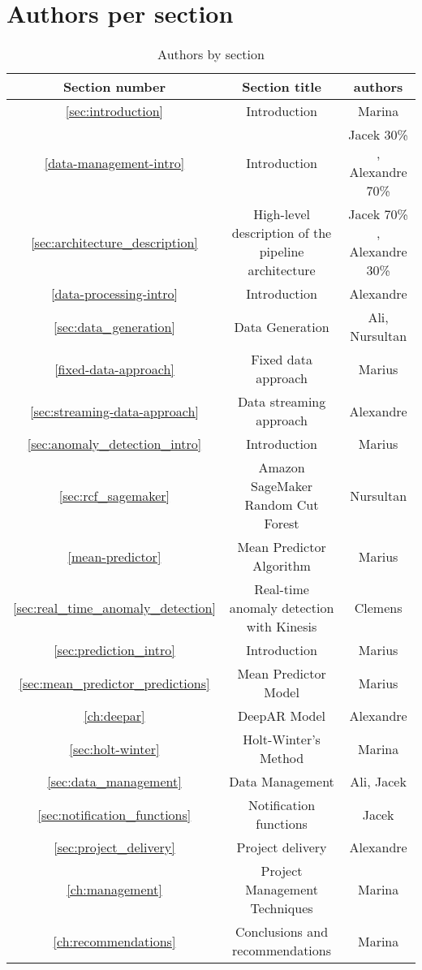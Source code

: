 \section{Authors per section}
\begin{table}
    \centering
    \begin{tabular}{c|c|c}
    \hline
      Section number & Section title & authors \\
    \hline
        \ref{sec:introduction} & Introduction & Marina  \\
        \hline
        \ref{data-management-intro} & Introduction & Jacek 30\% , Alexandre 70\%\\
        \ref{sec:architecture_description} & High-level description of the pipeline architecture & Jacek 70\% , Alexandre 30\% \\
        \hline
        \ref{data-processing-intro} & Introduction & Alexandre \\
        \ref{sec:data_generation} & Data Generation & Ali, Nursultan \\
        \ref{fixed-data-approach} & Fixed data approach & Marius \\
        \ref{sec:streaming-data-approach} & Data streaming approach & Alexandre \\
        \hline
        \ref{sec:anomaly_detection_intro} & Introduction & Marius \\
        \ref{sec:rcf_sagemaker} & Amazon SageMaker Random Cut Forest & Nursultan \\
        \ref{mean-predictor} & Mean Predictor Algorithm & Marius \\
        \ref{sec:real_time_anomaly_detection} & Real-time anomaly detection with Kinesis & Clemens \\
        \hline
        \ref{sec:prediction_intro} & Introduction & Marius \\
        \ref{sec:mean_predictor_predictions} & Mean Predictor Model & Marius \\
        \ref{ch:deepar} & DeepAR Model & Alexandre \\
        \ref{sec:holt-winter} & Holt-Winter's Method & Marina \\
        \hline
        \ref{sec:data_management} & Data Management & Ali, Jacek \\
        \hline
        \ref{sec:notification_functions} & Notification functions & Jacek \\
        \hline
        \ref{sec:project_delivery} & Project delivery & Alexandre \\
        \hline
        \ref{ch:management} & Project Management Techniques & Marina \\
        \hline
        \ref{ch:recommendations} & Conclusions and recommendations & Marina \\
        
    \end{tabular}
    \caption{Authors by section}
    \label{tab:authors-per-section}
\end{table}